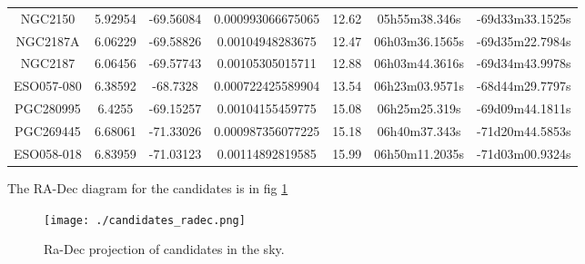 \documentclass[a4paper,10pt]{article}
\begin{document}
\begin{table}
\begin{tiny}
\begin{tabular}{ccccccc}
NGC2150 & 5.92954 & -69.56084 & 0.000993066675065 & 12.62 & 05h55m38.346s & -69d33m33.1525s \\
NGC2187A & 6.06229 & -69.58826 & 0.00104948283675 & 12.47 & 06h03m36.1565s & -69d35m22.7984s \\
NGC2187 & 6.06456 & -69.57743 & 0.00105305015711 & 12.88 & 06h03m44.3616s & -69d34m43.9978s \\
ESO057-080 & 6.38592 & -68.7328 & 0.000722425589904 & 13.54 & 06h23m03.9571s & -68d44m29.7797s \\
PGC280995 & 6.4255 & -69.15257 & 0.00104155459775 & 15.08 & 06h25m25.319s & -69d09m44.1811s \\
PGC269445 & 6.68061 & -71.33026 & 0.000987356077225 & 15.18 & 06h40m37.343s & -71d20m44.5853s \\
ESO058-018 & 6.83959 & -71.03123 & 0.00114892819585 & 15.99 & 06h50m11.2035s & -71d03m00.9324s \\
\end{tabular}
\end{tiny}
\label{tab:1}
\end{table}


The RA-Dec diagram for the candidates is in fig \ref{fig:candidatesRA-Dec}
\begin{figure}
 \centering
 \texttt{[image: ./candidates\_radec.png]}
 \caption{Ra-Dec projection of candidates in the sky.}
 \label{fig:candidatesRA-Dec}
\end{figure}
\end{document}
